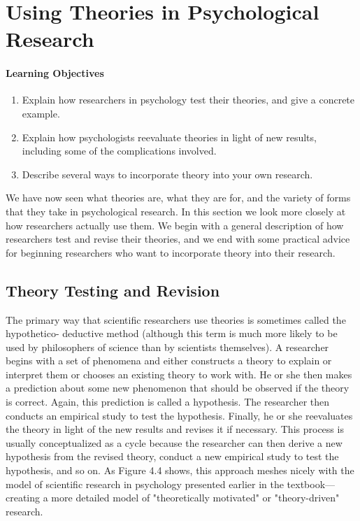 \newpage
\section{Using Theories in Psychological Research}

 \paragraph{Learning Objectives}
 \begin{enumerate}
 \item Explain how researchers in psychology test their theories, and give a concrete example.
 \item Explain how psychologists reevaluate theories in light of new results, including some of the complications involved.
 \item Describe several ways to incorporate theory into your own research.
   \end{enumerate}


We have now seen what theories are, what they are for, and the variety of forms that they take in psychological research. In this section we look more closely at how researchers actually use them. We begin with a general description of how researchers test and revise their theories, and we end with some practical advice for beginning researchers who want to incorporate theory into their research.

\subsection{Theory Testing and Revision}

The primary way that scientific researchers use theories is sometimes called the hypothetico- deductive method (although this term is much more likely to be used by philosophers of science than by scientists themselves). A researcher begins with a set of phenomena and either constructs a theory to explain or interpret them or chooses an existing theory to work with. He or she then makes a prediction about some new phenomenon that should be observed if the theory is correct. Again, this prediction is called a hypothesis. The researcher then conducts an empirical study to test the hypothesis. Finally, he or she reevaluates the theory in light of the new results and revises it if necessary. This process is usually conceptualized as a cycle because the researcher can then derive a new hypothesis from the revised theory, conduct a new empirical study to test the hypothesis, and so on. As Figure 4.4 shows, this approach meshes nicely with the model of scientific research in psychology presented earlier in the textbook---creating a more detailed model of "theoretically motivated" or "theory-driven" research.

